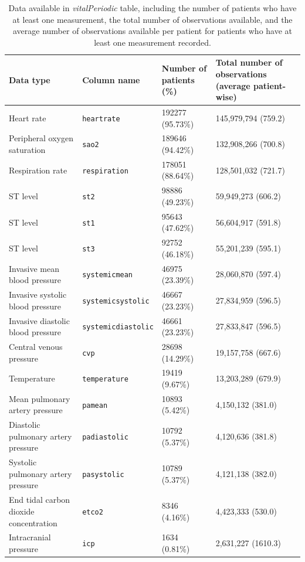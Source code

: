 \documentclass[english]{article}
\newcommand{\colname}[1]{\texttt{#1}}
\newcommand{\tblname}[1]{\emph{#1}}
\begin{document}
\begin{landscape}
\begin{table}
\begin{tabular}{l|p{3.2cm}|p{3.7cm}|p{4.7cm}}
  Data type  &  Column name  &  Number of patients (\%)  &
  Total number of observations (average patient-wise)  \\ \hline
  Heart rate                               & \colname{heartrate}          & 192277 (95.73\%) & 145,979,794 (759.2) \\
  Peripheral oxygen saturation             & \colname{sao2}               & 189646 (94.42\%) & 132,908,266 (700.8) \\
  Respiration rate                         & \colname{respiration}        & 178051 (88.64\%) & 128,501,032 (721.7) \\
  ST level                                 & \colname{st2}                &  98886 (49.23\%) & 59,949,273 (606.2) \\
  ST level                                 & \colname{st1}                &  95643 (47.62\%) & 56,604,917 (591.8) \\
  ST level                                 & \colname{st3}                &  92752 (46.18\%) & 55,201,239 (595.1) \\
  Invasive mean blood pressure             & \colname{systemicmean}       &  46975 (23.39\%) & 28,060,870 (597.4) \\
  Invasive systolic blood pressure         & \colname{systemicsystolic}   &  46667 (23.23\%) & 27,834,959 (596.5) \\
  Invasive diastolic blood pressure        & \colname{systemicdiastolic}  &  46661 (23.23\%) & 27,833,847 (596.5) \\
  Central venous pressure                  & \colname{cvp}                &  28698 (14.29\%) & 19,157,758 (667.6) \\
  Temperature                              & \colname{temperature}        &  19419 (9.67\%) & 13,203,289 (679.9) \\
  Mean pulmonary artery pressure           & \colname{pamean}             &  10893 (5.42\%) & 4,150,132 (381.0) \\
  Diastolic pulmonary artery pressure      & \colname{padiastolic}        &  10792 (5.37\%) & 4,120,636 (381.8) \\
  Systolic pulmonary artery pressure       & \colname{pasystolic}         &  10789 (5.37\%) & 4,121,138 (382.0) \\
  End tidal carbon dioxide concentration   & \colname{etco2}              &   8346 (4.16\%) & 4,423,333 (530.0) \\
  Intracranial pressure                    & \colname{icp}                &   1634 (0.81\%) & 2,631,227 (1610.3) \\
  \hline
  \end{tabular}
 \caption{Data available in \tblname{vitalPeriodic} table, including the
number of patients who have at least one measurement, the total number
of observations available, and the average number of observations
available per patient for patients who have at least one measurement recorded.
\label{tab:vitalperiodic}}
 \end{table}
\end{landscape}
\end{document}
